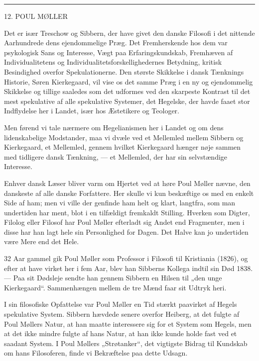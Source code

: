 \documentclass[12pt,a4paper,openany]{book}
\newcommand{\opage}[1]{\marginnote{\footnotesize\textit{[#1]}}}
\begin{document}
\begin{center}\rule{2cm}{0.4pt}\end{center}

\setcounter{footnote}{0}%
\opage{118}

\begin{center}\large 12. POUL MØLLER\end{center}

Det er især Treschow og Sibbern, der have givet den danske Filosofi i det
nittende Aarhundrede dens ejendommelige Præg. Det Fremherskende hos dem var
psykologisk Sans og Interesse, Vægt paa Erfaringskundskab, Fremhæven af
Individualitetens og Individualitetsforskellighedernes Betydning, kritisk
Besindighed overfor Spekulationerne. Den største Skikkelse i dansk Tænknings
Historie, Søren Kierkegaard, vil vise os det samme Præg i en ny og ejendommelig
Skikkelse og tillige saaledes som det udformes ved den skarpeste Kontrast til
det mest spekulative af alle spekulative Systemer, det Hegelske, der havde
faaet stor Indflydelse her i Landet, især hos Æstetikere og Teologer.

Men førend vi tale nærmere om Hegelianismen her i Landet og om dens
lidenskabelige Modstander, maa vi dvæle ved et Mellemled mellem Sibbern og
Kierkegaard, et Mellemled, gennem hvilket Kierkegaard hænger nøje sammen med
tidligere dansk Tænkning, --- et Mellemled, der har sin selvstændige Interesse.

Enhver dansk Læser bliver varm om Hjertet ved at høre Poul Møller nævne, den
danskeste af alle danske Forfattere. Her skulle vi kun beskæftige os med en
enkelt Side af ham; men vi ville der genfinde ham helt og klart, langtfra, som
man undertiden har ment, blot i en tilfældigt fremkaldt Stilling. Hverken som
Digter, Filolog eller Filosof har Poul Møller efterladt sig Andet end
Fragmenter, men i disse har han lagt hele sin Personlighed for Dagen. Det Halve
kan jo undertiden være Mere end det Hele.

\setcounter{footnote}{0}%
\opage{119}32 Aar gammel gik Poul Møller som Professor i Filosofi til
Kristiania (1826), og efter at have virket her i fem Aar, blev han Sibberns
Kollega indtil sin Død 1838. --- Paa sit Dødsleje sendte han gennem Sibbern en
Hilsen til „den unge Kierkegaard“. Sammenhængen mellem de tre Mænd faar sit
Udtryk heri.

I sin filosofiske Opfattelse var Poul Møller en Tid stærkt paavirket af Hegels
spekulative System. Sibbern hævdede senere overfor Heiberg, at det fulgte af
Poul Møllers Natur, at han maatte interessere sig for et System som Hegels, men
at det ikke mindre fulgte af hans Natur, at han ikke kunde holde fast ved et
saadant System. I Poul Møllers „Strøtanker“, det vigtigste Bidrag til Kundskab
om hans Filosoferen, finde vi Bekræftelse paa dette Udsagn.
\end{document}
